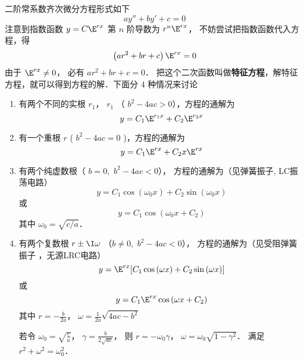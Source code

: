 

二阶常系数齐次微分方程形式如下
\begin{equation}
ay'' + by' + c = 0
\end{equation}
注意到指数函数 $y = C{\E^{rx}}$ 第 $n$ 阶导数为 ${r^n}{\E^{rx}}$， 不妨尝试把指数函数代入方程，得
\begin{equation}
\left( {a{r^2} + br + c} \right){\E^{rx}} = 0
\end{equation}
由于 ${\E^{rx}} \ne 0$， 必有 $a{r^2} + br + c = 0$． 把这个二次函数叫做\textbf{特征方程}，解特征方程，就可以得到方程的解．下面分 $4$ 种情况来讨论

\begin{enumerate}
\item 有两个不同的实根 ${r_1}$，  ${r_1}$ （ ${b^2} - 4ac > 0$），方程的通解为
 \begin{equation}
y = {C_1}{\E^{{r_1}x}} + {C_2}{\E^{{r_2}x}}
\end{equation}
\item 有一个重根 $r$ ( ${b^2} - 4ac = 0$ )，方程的通解为
 \begin{equation}
y = {C_1}{\E^{rx}} + {C_2}x{\E^{rx}}
\end{equation}
\item 有两个纯虚数根（ ${b = 0,\,\,{b^2} - 4ac < 0}$）， 方程的通解为（见弹簧振子,%
 LC振荡电路）
\begin{equation}
y = {C_1}\cos \left( {{\omega _0}x} \right) + {C_2}\sin \left( {{\omega _0}x} \right)
\end{equation}
或 
\begin{equation}
y = {C_1}\cos \left( {{\omega _0}x + {C_2}} \right)
\end{equation} 
其中 ${\omega _0} = \sqrt {{c}/{a}}$． 

\item 有两个复数根 $r \pm \I\omega $ （${b \ne 0,\,\,{b^2} - 4ac < 0}$）， 方程的通解为（见受阻弹簧振子%
，无源LRC电路）%
\begin{equation}
y = {\E^{rx}}[ {{C_1}\cos \left( {\omega x} \right) + {C_2}\sin \left( {\omega x} \right)} ]
\end{equation} 
或 
\begin{equation}
y = {C_1}{\E^{rx}}\cos \left( {\omega x + {C_2}} \right)
\end{equation} 
其中 $r =  - \frac{b}{{2a}}$，  $\omega  = \frac{1}{{2a}}\sqrt {4ac - {b^2}} $

若令 ${\omega _0} = \sqrt {\frac{c}{a}} $，  $\gamma  = \frac{b}{{2\sqrt {ac} }}$，  则 $r =  - {\omega _0}\gamma $，  $\omega  = {\omega _0}\sqrt {1 - {\gamma ^2}} $． 满足 ${r^2} + {\omega ^2} = \omega _0^2$． 
\end{enumerate}


















 
